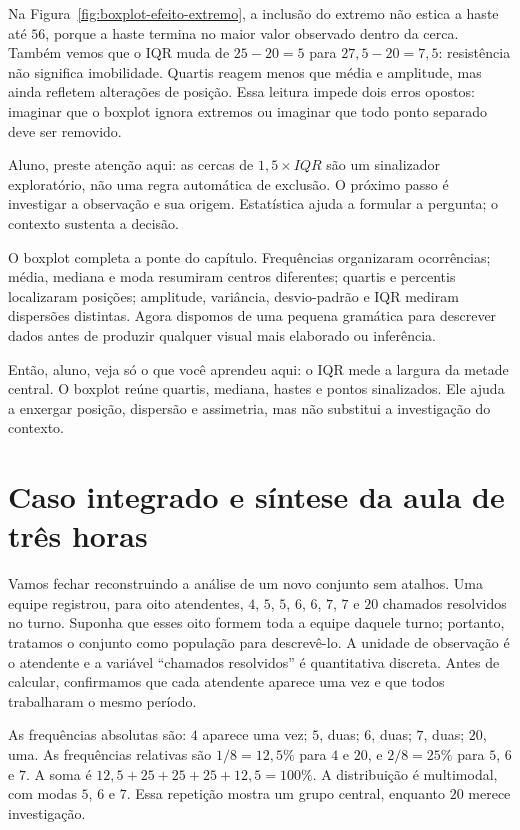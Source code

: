 Na Figura~\ref{fig:boxplot-efeito-extremo}, a inclusão do extremo não estica a haste até $56$, porque a haste termina no maior valor observado dentro da cerca. Também vemos que o IQR muda de $25-20=5$ para $27{,}5-20=7{,}5$: resistência não significa imobilidade. Quartis reagem menos que média e amplitude, mas ainda refletem alterações de posição. Essa leitura impede dois erros opostos: imaginar que o boxplot ignora extremos ou imaginar que todo ponto separado deve ser removido.

\begin{GuidedBox}
Aluno, preste atenção aqui: as cercas de $1{,}5\times IQR$ são um sinalizador exploratório, não uma regra automática de exclusão. O próximo passo é investigar a observação e sua origem. Estatística ajuda a formular a pergunta; o contexto sustenta a decisão.
\end{GuidedBox}

O boxplot completa a ponte do capítulo. Frequências organizaram ocorrências; média, mediana e moda resumiram centros diferentes; quartis e percentis localizaram posições; amplitude, variância, desvio-padrão e IQR mediram dispersões distintas. Agora dispomos de uma pequena gramática para descrever dados antes de produzir qualquer visual mais elaborado ou inferência.

\begin{SummaryBox}
Então, aluno, veja só o que você aprendeu aqui: o IQR mede a largura da metade central. O boxplot reúne quartis, mediana, hastes e pontos sinalizados. Ele ajuda a enxergar posição, dispersão e assimetria, mas não substitui a investigação do contexto.
\end{SummaryBox}

\section{Caso integrado e síntese da aula de três horas}

Vamos fechar reconstruindo a análise de um novo conjunto sem atalhos. Uma equipe registrou, para oito atendentes, $4$, $5$, $5$, $6$, $6$, $7$, $7$ e $20$ chamados resolvidos no turno. Suponha que esses oito formem toda a equipe daquele turno; portanto, tratamos o conjunto como população para descrevê-lo. A unidade de observação é o atendente e a variável ``chamados resolvidos'' é quantitativa discreta. Antes de calcular, confirmamos que cada atendente aparece uma vez e que todos trabalharam o mesmo período.

As frequências absolutas são: $4$ aparece uma vez; $5$, duas; $6$, duas; $7$, duas; $20$, uma. As frequências relativas são $1/8=12{,}5\%$ para $4$ e $20$, e $2/8=25\%$ para $5$, $6$ e $7$. A soma é $12{,}5+25+25+25+12{,}5=100\%$. A distribuição é multimodal, com modas $5$, $6$ e $7$. Essa repetição mostra um grupo central, enquanto $20$ merece investigação.

